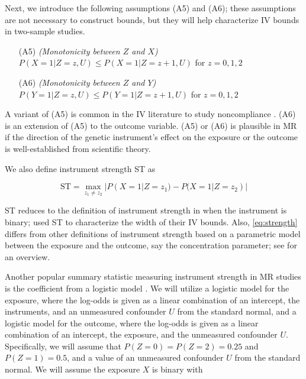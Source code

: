\documentclass[AMA,STIX1COL,]{WileyNJD-v2}
\begin{document}
Next, we introduce the following assumptions (A5) and (A6); these
assumptions are not necessary to construct bounds, but they will help
characterize IV bounds in two-sample studies.

\begin{itemize}
\item[(A5)] \emph{(Monotonicity between $Z$ and $X$)} $P(X = 1 | Z = z, U) \le P(X = 1 | Z = z+1, U)$ for $z=0,1,2$
\item[(A6)] \emph{(Monotonicity between $Z$ and $Y$)} $P(Y = 1 | Z = z, U) \le P(Y = 1 | Z = z+1, U)$ for $z=0,1,2$
\end{itemize}

A variant of (A5) is common in the IV literature to study noncompliance
\citep{angrist_identification_1996, baiocchi_instrumental_2014}. (A6) is
an extension of (A5) to the outcome variable. (A5) or (A6) is plausible
in MR if the direction of the genetic instrument's effect on the
exposure or the outcome is well-established from scientific theory.

We also define instrument strength ST as

\begin{equation}
\text{ST} = \max_{z_1 \neq z_2} | P(X = 1 | Z = z_1) - P(X = 1 | Z = z_2) | \label{eq:strength}
\end{equation}

ST reduces to the definition of instrument strength in
\citep{balke_bounds_1997} when the instrument is binary;
\citep{balke_bounds_1997} used ST to characterize the width of their IV
bounds. Also, \eqref{eq:strength} differs from other definitions of
instrument strength based on a parametric model between the exposure and
the outcome, say the concentration parameter; see
\citep{stock_survey_2002} for an overview.

Another popular summary statistic measuring instrument strength in MR
studies is the coefficient from a logistic model
\citep{lawlor_mendelian_2008, burgess_sample_2014, verma_simulation_2018, millard_mr-phewas_2019, king_mendelian_2020}.
We will utilize a logistic model for the exposure, where the log-odds is
given as a linear combination of an intercept, the instruments, and an
unmeasured confounder \(U\) from the standard normal, and a logistic
model for the outcome, where the log-odds is given as a linear
combination of an intercept, the exposure, and the unmeasured confounder
\(U\). Specifically, we will assume that \(P(Z = 0) = P(Z = 2) = 0.25\)
and \(P(Z = 1) = 0.5\), and a value of an unmeasured confounder \(U\)
from the standard normal. We will assume the exposure \(X\) is binary
with
\end{document}
